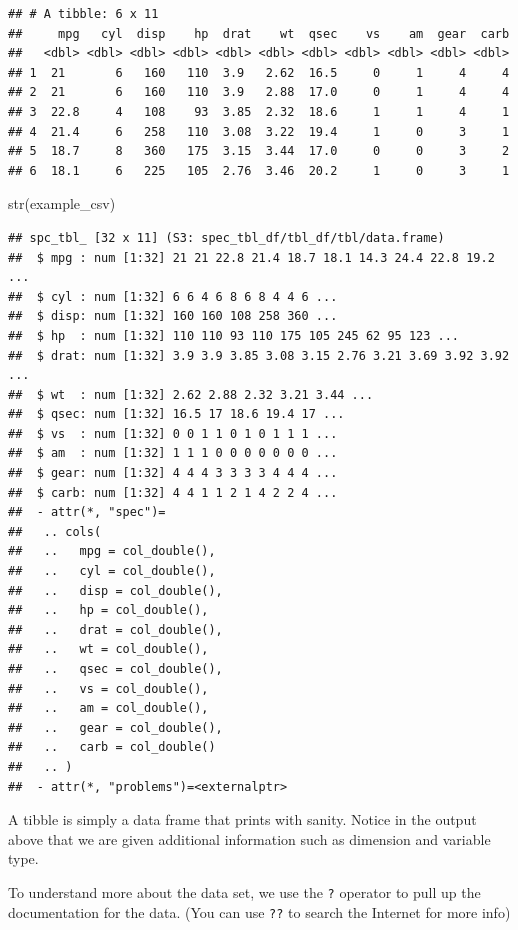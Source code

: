 \documentclass[
]{book}
\newenvironment{Shaded}{\begin{snugshade}}{\end{snugshade}}
\newcommand{\FunctionTok}[1]{\textcolor[rgb]{0.00,0.00,0.00}{#1}}
\newcommand{\NormalTok}[1]{#1}
\begin{document}
\begin{verbatim}
## # A tibble: 6 x 11
##     mpg   cyl  disp    hp  drat    wt  qsec    vs    am  gear  carb
##   <dbl> <dbl> <dbl> <dbl> <dbl> <dbl> <dbl> <dbl> <dbl> <dbl> <dbl>
## 1  21       6   160   110  3.9   2.62  16.5     0     1     4     4
## 2  21       6   160   110  3.9   2.88  17.0     0     1     4     4
## 3  22.8     4   108    93  3.85  2.32  18.6     1     1     4     1
## 4  21.4     6   258   110  3.08  3.22  19.4     1     0     3     1
## 5  18.7     8   360   175  3.15  3.44  17.0     0     0     3     2
## 6  18.1     6   225   105  2.76  3.46  20.2     1     0     3     1
\end{verbatim}

\begin{Shaded}
\begin{Highlighting}[]
\FunctionTok{str}\NormalTok{(example\_csv)}
\end{Highlighting}
\end{Shaded}

\begin{verbatim}
## spc_tbl_ [32 x 11] (S3: spec_tbl_df/tbl_df/tbl/data.frame)
##  $ mpg : num [1:32] 21 21 22.8 21.4 18.7 18.1 14.3 24.4 22.8 19.2 ...
##  $ cyl : num [1:32] 6 6 4 6 8 6 8 4 4 6 ...
##  $ disp: num [1:32] 160 160 108 258 360 ...
##  $ hp  : num [1:32] 110 110 93 110 175 105 245 62 95 123 ...
##  $ drat: num [1:32] 3.9 3.9 3.85 3.08 3.15 2.76 3.21 3.69 3.92 3.92 ...
##  $ wt  : num [1:32] 2.62 2.88 2.32 3.21 3.44 ...
##  $ qsec: num [1:32] 16.5 17 18.6 19.4 17 ...
##  $ vs  : num [1:32] 0 0 1 1 0 1 0 1 1 1 ...
##  $ am  : num [1:32] 1 1 1 0 0 0 0 0 0 0 ...
##  $ gear: num [1:32] 4 4 4 3 3 3 3 4 4 4 ...
##  $ carb: num [1:32] 4 4 1 1 2 1 4 2 2 4 ...
##  - attr(*, "spec")=
##   .. cols(
##   ..   mpg = col_double(),
##   ..   cyl = col_double(),
##   ..   disp = col_double(),
##   ..   hp = col_double(),
##   ..   drat = col_double(),
##   ..   wt = col_double(),
##   ..   qsec = col_double(),
##   ..   vs = col_double(),
##   ..   am = col_double(),
##   ..   gear = col_double(),
##   ..   carb = col_double()
##   .. )
##  - attr(*, "problems")=<externalptr>
\end{verbatim}

A tibble is simply a data frame that prints with sanity. Notice in the output above that we are given additional information such as dimension and variable type.

To understand more about the data set, we use the \texttt{?} operator to pull up the documentation for the data. (You can use \texttt{??} to search the Internet for more info)
\end{document}
